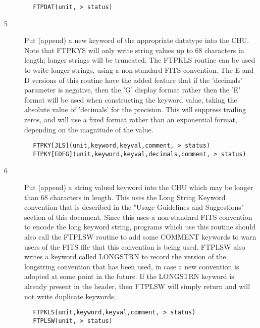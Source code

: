 \documentclass[11pt]{book}
\begin{document}
\begin{verbatim}
        FTPDAT(unit, > status)
\end{verbatim}

\begin{description}
\item[5 ] Put (append) a new keyword of the appropriate datatype into the CHU.
    Note that FTPKYS will only write string values up to 68 characters in
    length; longer strings will be truncated.  The FTPKLS routine can be
    used to write longer strings, using a non-standard FITS convention.
     The E and D versions of this routine have the added feature that
     if the 'decimals' parameter is negative, then the 'G' display
     format rather then the 'E' format will be used when constructing
     the keyword value, taking the absolute value of 'decimals' for the
     precision.  This will suppress trailing zeros, and will use a
     fixed format rather than an exponential format,
    depending on the magnitude of the value.
\end{description}

\begin{verbatim}
        FTPKY[JLS](unit,keyword,keyval,comment, > status)
        FTPKY[EDFG](unit,keyword,keyval,decimals,comment, > status)
\end{verbatim}

\begin{description}
\item[6 ] Put (append) a string valued keyword into the CHU which may be longer
    than 68 characters in length.  This uses the Long String Keyword
    convention that is described in the "Usage Guidelines and Suggestions"
    section of this document.  Since this uses a non-standard FITS
    convention to encode the long keyword string, programs which use
    this routine should also call the FTPLSW routine to add some COMMENT
    keywords to warn users of the FITS file that this convention is
    being used.  FTPLSW also writes a keyword called LONGSTRN to record
    the version of the longstring convention that has been used, in case
    a new convention is adopted at some point in the future.   If the
    LONGSTRN keyword is already present in the header, then FTPLSW will
   simply return and will not write duplicate keywords.
\end{description}

\begin{verbatim}
        FTPKLS(unit,keyword,keyval,comment, > status)
        FTPLSW(unit, > status)
\end{verbatim}
\end{document}
